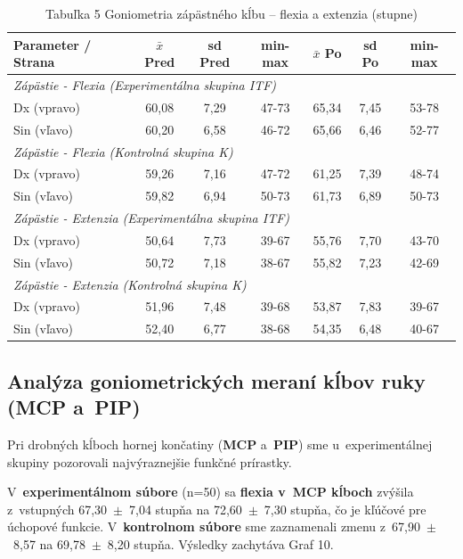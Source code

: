 \begin{table}[H]
\centering
\caption*{Tabuľka 5 Goniometria zápästného kĺbu – flexia a extenzia (stupne)}
\begin{tabular}{|l|c|c|c|c|c|c|}
\hline
\textbf{Parameter / Strana} & \textbf{$\bar{x}$ Pred} & \textbf{sd Pred} & \textbf{min-max} & \textbf{$\bar{x}$ Po} & \textbf{sd Po} & \textbf{min-max} \\ \hline
\multicolumn{7}{|l|}{\textit{Zápästie - Flexia (Experimentálna skupina ITF)}} \\ \hline
Dx (vpravo) & 60,08 & 7,29 & 47-73 & 65,34 & 7,45 & 53-78 \\ \hline
Sin (vľavo) & 60,20 & 6,58 & 46-72 & 65,66 & 6,46 & 52-77 \\ \hline
\multicolumn{7}{|l|}{\textit{Zápästie - Flexia (Kontrolná skupina K)}} \\ \hline
Dx (vpravo) & 59,26 & 7,16 & 47-72 & 61,25 & 7,39 & 48-74 \\ \hline
Sin (vľavo) & 59,82 & 6,94 & 50-73 & 61,73 & 6,89 & 50-73 \\ \hline
\multicolumn{7}{|l|}{\textit{Zápästie - Extenzia (Experimentálna skupina ITF)}} \\ \hline
Dx (vpravo) & 50,64 & 7,73 & 39-67 & 55,76 & 7,70 & 43-70 \\ \hline
Sin (vľavo) & 50,72 & 7,18 & 38-67 & 55,82 & 7,23 & 42-69 \\ \hline
\multicolumn{7}{|l|}{\textit{Zápästie - Extenzia (Kontrolná skupina K)}} \\ \hline
Dx (vpravo) & 51,96 & 7,48 & 39-68 & 53,87 & 7,83 & 39-67 \\ \hline
Sin (vľavo) & 52,40 & 6,77 & 38-68 & 54,35 & 6,48 & 40-67 \\ \hline
\end{tabular}
\end{table}



\subsection{Analýza goniometrických meraní kĺbov ruky (MCP a~PIP)}

Pri drobných kĺboch hornej končatiny (\textbf{MCP} a~\textbf{PIP}) sme u~experimentálnej skupiny pozorovali najvýraznejšie funkčné prírastky. 

V~\textbf{experimentálnom súbore} (n=50) sa \textbf{flexia v~MCP kĺboch} zvýšila z~vstupných 67,30~$\pm$~7,04 stupňa na 72,60~$\pm$~7,30 stupňa, čo je kľúčové pre úchopové funkcie. V~\textbf{kontrolnom súbore} sme zaznamenali zmenu z~67,90~$\pm$~8,57 na 69,78~$\pm$~8,20 stupňa. Výsledky zachytáva Graf 10.

